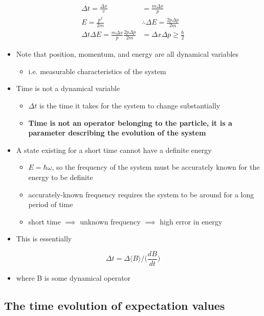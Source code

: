 \documentclass[a4paper,11pt,normalem]{article}
\begin{document}
\[
    \begin{aligned}
    \Delta t = \frac{\Delta x}{v} &= \frac{m\Delta x}{p} \\
    E = \frac{p^2}{2m} &\therefore \Delta E = \frac{2p\Delta p}{2m} \\
    \Delta t \Delta E = \frac{m\Delta x}{p}\frac{2p\Delta p}{2m} &= \Delta x \Delta p \geq \frac{\hbar}{2}
    \end{aligned}
\]

\begin{itemize}
\item
  Note that position, momentum, and energy are all dynamical variables
  \begin{itemize}
  \item
    i.e. measurable characteristics of the system
  \end{itemize}
\item
  Time is not a dynamical variable
  \begin{itemize}
  \item
    \(\Delta t\) is the time it takes for the system to change
    substantially
  \item
    \textbf{Time is not an operator belonging to the particle, it is a
    parameter describing the evolution of the system}
  \end{itemize}
\item
  A state existing for a short time cannot have a definite energy
  \begin{itemize}
  \item
    \(E = \hbar\omega\), so the frequency of the system must be
    accurately known for the energy to be definite
  \item
    accurately-known frequency requires the system to be around for a
    long period of time
  \item
    short time \(\implies\) unknown frequency \(\implies\) high error in
    energy
  \end{itemize}
\item
  This is essentially
\end{itemize}

\[
    \Delta t = \Delta \langle B \rangle \Big/\Big(\frac{dB}{dt}\Big)
\]

\begin{itemize}
\item
  where B is some dynamical operator
\end{itemize}

\subsection{The time evolution of expectation values}\label{the-time-evolution-of-expectation-values}
\end{document}
